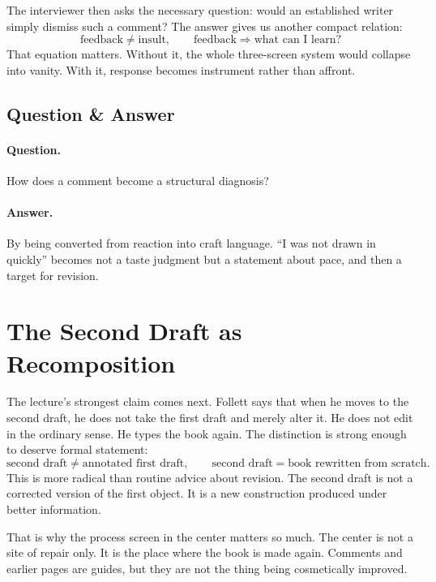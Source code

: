 The interviewer then asks the necessary question: would an established writer simply dismiss such a comment? The answer gives us another compact relation:
\begin{equation}
\text{feedback} \neq \text{insult}, \qquad
\text{feedback} \Rightarrow \text{what can I learn?}
\end{equation}
That equation matters. Without it, the whole three-screen system would collapse into vanity. With it, response becomes instrument rather than affront.

\subsection{Question \& Answer}

\paragraph{Question.} How does a comment become a structural diagnosis?

\paragraph{Answer.} By being converted from reaction into craft language. ``I was not drawn in quickly'' becomes not a taste judgment but a statement about pace, and then a target for revision.

\section{The Second Draft as Recomposition}

The lecture's strongest claim comes next. Follett says that when he moves to the second draft, he does not take the first draft and merely alter it. He does not edit in the ordinary sense. He types the book again. The distinction is strong enough to deserve formal statement:
\begin{equation}
\text{second draft} \neq \text{annotated first draft}, \qquad
\text{second draft} = \text{book rewritten from scratch}.
\end{equation}
This is more radical than routine advice about revision. The second draft is not a corrected version of the first object. It is a new construction produced under better information.

That is why the process screen in the center matters so much. The center is not a site of repair only. It is the place where the book is made again. Comments and earlier pages are guides, but they are not the thing being cosmetically improved.


